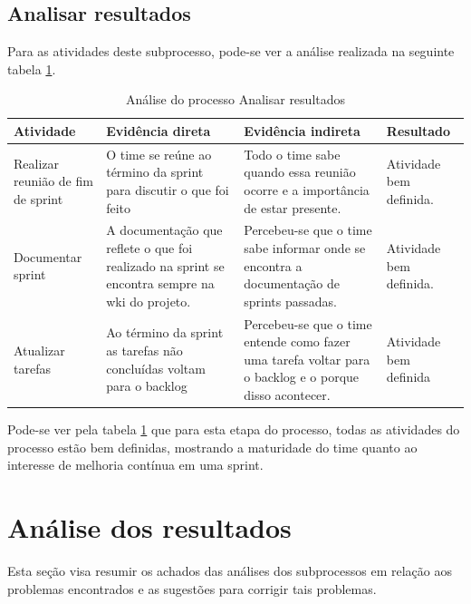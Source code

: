 \documentclass[a4paper, 11pt]{article}
\begin{document}
\subsection*{Analisar resultados}

Para as atividades deste subprocesso, pode-se ver a análise realizada na
seguinte tabela \ref{tab:analisar}.

\begin{table}[]
\centering
\caption{Análise do processo Analisar resultados}
\label{tab:analisar}
\begin{tabularx}{\textwidth}{|X|X|X|X|}
\hline
Atividade & Evidência direta & Evidência indireta & Resultado \\ \hline
Realizar reunião de fim de sprint & O time se reúne ao término da sprint para discutir o que foi feito & Todo o time sabe quando essa reunião ocorre e a importância de estar presente. & Atividade bem definida. \\ \hline
Documentar sprint & A documentação que reflete o que foi realizado na sprint se encontra sempre na wki do projeto. & Percebeu-se que o time sabe informar onde se encontra a documentação de sprints passadas. & Atividade bem definida. \\ \hline
Atualizar tarefas & Ao término da sprint as tarefas não concluídas voltam para o backlog & Percebeu-se que o time entende como fazer uma tarefa voltar para o backlog e o porque disso acontecer. & Atividade bem definida \\ \hline
\end{tabularx}
\end{table}

Pode-se ver pela tabela \ref{tab:analisar} que para esta etapa do processo,
todas as atividades do processo estão bem definidas, mostrando a maturidade do
time quanto ao interesse de melhoria contínua em uma sprint.

\section*{Análise dos resultados}

Esta seção visa resumir os achados das análises dos subprocessos em relação aos
problemas encontrados e as sugestões para corrigir tais problemas.
\end{document}
